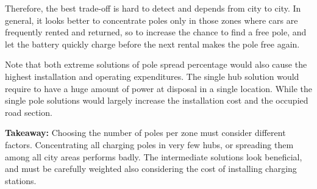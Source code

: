 


Therefore, the best trade-off is hard to detect and depends from city to city. 
In general, it looks better to concentrate poles only in those zones where cars are frequently rented and returned, so to increase the chance to find a free pole, and let the battery quickly charge before the next rental makes the pole free again. %

Note that both extreme solutions of pole spread percentage would also cause the highest installation and operating expenditures. The single hub solution would require to have a huge amount of power at disposal in a single location. While the single pole solutions would largely increase the installation cost and the occupied road section.

\textbf{Takeaway:} Choosing the number of poles per zone must consider different factors. Concentrating all charging poles in very few hubs, or spreading them among all city areas performs badly. The intermediate solutions look beneficial, and must be carefully weighted also considering the cost of installing charging stations.




